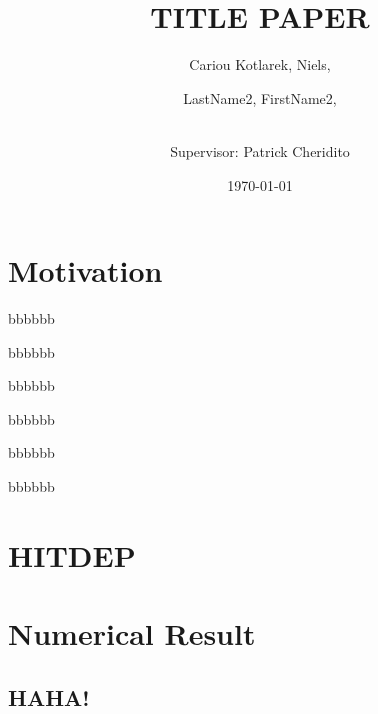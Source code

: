 \documentclass[10pt]{amsart}
\title{TITLE PAPER}
\author{
    Cariou Kotlarek, Niels,\\
    \and
    LastName2, FirstName2,\\
    \and
    \\ Supervisor: Patrick Cheridito
}
\date{\today}
\begin{document}
\maketitle
    \begin{abstract}
    \end{abstract}
    


    \section{Motivation}
    \lipsum
    \begin{theorem}
    \end{theorem}

    \begin{corollary}
    \end{corollary}

    \begin{proposition}
        bbbbbb
    \end{proposition}

    \begin{conjecture}
        bbbbbb
    \end{conjecture}

    \begin{lemma}
        bbbbbb
    \end{lemma}

    \begin{definition}
        bbbbbb
    \end{definition}

    \begin{remark}
        bbbbbb
    \end{remark}

    \begin{assumption}
        bbbbbb
    \end{assumption}


    \section{HITDEP}
    \lipsum


    \section{Numerical Result}

    \subsection{HAHA!}
    \lipsum


    \printbibliography[category=cited]%
    \printbibliography[title={Further Reading},notcategory=cited]
    \nocite{*}
\end{document}
